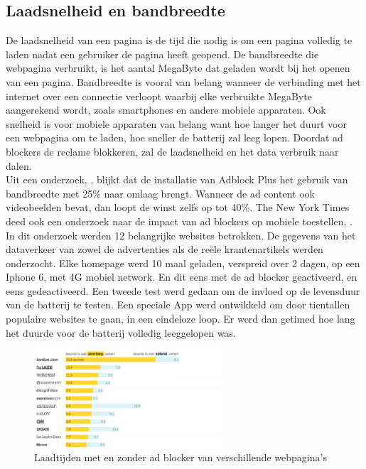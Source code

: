 \documentclass[pdftex,a4paper,12pt,twoside]{report}
\begin{document}
\subsection{Laadsnelheid en bandbreedte}
\label{sec Laadsnelheid en bandbreedte}
De laadsnelheid van een pagina is de tijd die nodig is om een pagina volledig te laden nadat een gebruiker de pagina heeft geopend. De bandbreedte die webpagina verbruikt, is het aantal MegaByte dat geladen wordt bij het openen van een pagina. Bandbreedte is vooral van belang wanneer de verbinding met het internet over een connectie verloopt waarbij elke verbruikte MegaByte aangerekend wordt, zoals smartphones en andere mobiele apparaten. Ook snelheid is voor mobiele apparaten van belang want hoe langer het duurt voor een webpagina om te laden, hoe sneller de batterij zal leeg lopen. Doordat ad blockers de reclame blokkeren, zal de laadsnelheid en het data verbruik naar dalen.
\\
Uit een onderzoek, \cite{Fraser2015}, blijkt dat de installatie van Adblock Plus het gebruik van bandbreedte met 25\% naar omlaag brengt. Wanneer de ad content ook videobeelden bevat, dan loopt de winst zelfs op tot 40\%.
The New York Times deed ook een onderzoek naar de impact van ad blockers op mobiele toestellen, \cite{nytimes2015}.
In dit onderzoek werden 12 belangrijke websites betrokken. De gegevens van het dataverkeer van zowel de advertenties als de reële krantenartikels werden onderzocht. Elke homepage werd 10 maal geladen, verspreid over 2 dagen, op een Iphone 6, met 4G mobiel network. En dit eens met de ad blocker geactiveerd, en eens gedeactiveerd. Een tweede test werd gedaan om de invloed op de levensduur van de batterij te testen. Een speciale App werd ontwikkeld om door tientallen populaire websites te gaan, in een eindeloze loop. Er werd dan getimed hoe lang het duurde voor de batterij volledig leeggelopen was.

\begin{figure}[h!]
\centering
\includegraphics[width=7cm]{img/LoadTimes}
\caption{Laadtijden met en zonder ad blocker van verschillende webpagina's}
\label{fig: Redenadblockreclame}
\end{figure}
\end{document}
